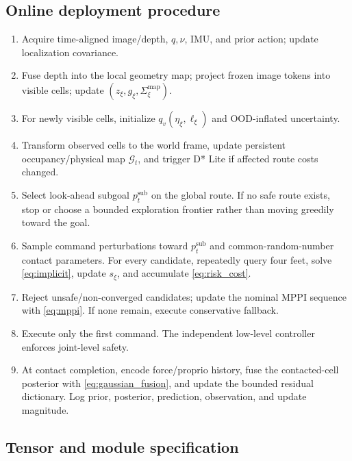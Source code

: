 \subsection{Online deployment procedure}

\begin{tcolorbox}[colback=paper,colframe=teal,title={Algorithm 2: one receding-horizon cycle},fonttitle=\bfseries\color{navy}]
\begin{enumerate}[leftmargin=1.8em]
  \item Acquire time-aligned image/depth, $q,\nu$, IMU, and prior action; update localization covariance.
  \item Fuse depth into the local geometry map; project frozen image tokens into visible cells; update $(z_\xi,g_\xi,\Sigma_\xi^{\mathrm{map}})$.
  \item For newly visible cells, initialize $q_v(\eta_\xi,\ell_\xi)$ and OOD-inflated uncertainty.
  \item Transform observed cells to the world frame, update persistent occupancy/physical map $\mathcal G_t$, and trigger D* Lite if affected route costs changed.
  \item Select look-ahead subgoal $p_t^{\mathrm{sub}}$ on the global route. If no safe route exists, stop or choose a bounded exploration frontier rather than moving greedily toward the goal.
  \item Sample command perturbations toward $p_t^{\mathrm{sub}}$ and common-random-number contact parameters. For every candidate, repeatedly query four feet, solve \cref{eq:implicit}, update $s_\xi$, and accumulate \cref{eq:risk_cost}.
  \item Reject unsafe/non-converged candidates; update the nominal MPPI sequence with \cref{eq:mppi}. If none remain, execute conservative fallback.
  \item Execute only the first command. The independent low-level controller enforces joint-level safety.
  \item At contact completion, encode force/proprio history, fuse the contacted-cell posterior with \cref{eq:gaussian_fusion}, and update the bounded residual dictionary. Log prior, posterior, prediction, observation, and update magnitude.
\end{enumerate}
\end{tcolorbox}

\subsection{Tensor and module specification}

